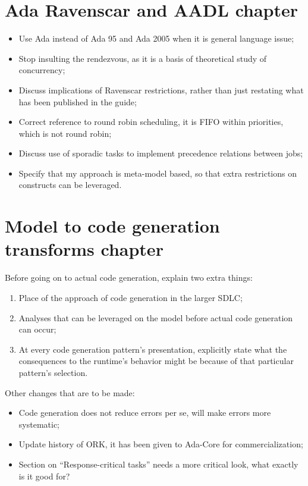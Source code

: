 \documentclass{article}
\begin{document}
\section{Ada Ravenscar and AADL chapter}
\begin{itemize}
\item{Use Ada instead of Ada 95 and Ada 2005 when it is general
  language issue;}
\item{Stop insulting the rendezvous, as it is a basis of theoretical
  study of concurrency;}
\item{Discuss implications of Ravenscar restrictions, rather than just
  restating what has been published in the guide;}
\item{Correct reference to round robin scheduling, it is FIFO within
  priorities, which is not round robin;}
\item{Discuss use of sporadic tasks to implement precedence relations
  between jobs;}
\item{Specify that my approach is meta-model based, so that extra
  restrictions on constructs can be leveraged.}
\end{itemize}

\section{Model to code generation transforms chapter}
Before going on to actual code generation, explain two extra things:

\begin{enumerate}
\item{Place of the approach of code generation in the larger SDLC;}
\item{Analyses that can be leveraged on the model before actual code
  generation can occur;}
\item{At every code generation pattern's presentation, explicitly
  state what the consequences to the runtime's behavior might be
  because of that particular pattern's selection.}
\end{enumerate}

Other changes that are to be made:

\begin{itemize}
\item{Code generation does not reduce errors per se, will make errors
  more systematic;}
\item{Update history of ORK, it has been given to Ada-Core for
  commercialization;}
\item{Section on ``Response-critical tasks'' needs a more critical
  look, what exactly is it good for?}
\end{itemize}
\end{document}
